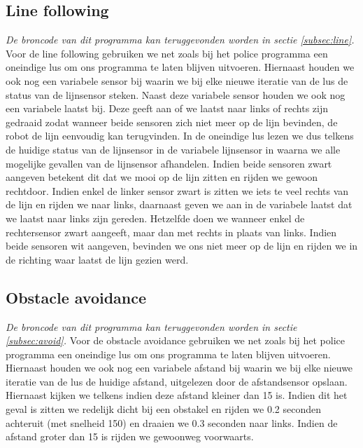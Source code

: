 \documentclass[12pt, titlepage]{article}
\begin{document}
\subsection{Line following}
\emph{De broncode van dit programma kan teruggevonden worden in sectie \ref{subsec:line}.}
\newline
\newline
Voor de line following gebruiken we net zoals bij het police programma een oneindige lus om ons programma te laten blijven uitvoeren. Hiernaast houden we ook nog een variabele sensor bij waarin we bij elke nieuwe iteratie van de lus de status van de lijnsensor steken. Naast deze variabele sensor houden we ook nog een variabele laatst bij. Deze geeft aan of we laatst naar links of rechts zijn gedraaid zodat wanneer beide sensoren zich niet meer op de lijn bevinden, de robot de lijn eenvoudig kan terugvinden. In de oneindige lus lezen we dus telkens de huidige status van de lijnsensor in de variabele lijnsensor in waarna we alle mogelijke gevallen van de lijnsensor afhandelen. Indien beide sensoren zwart aangeven betekent dit dat we mooi op de lijn zitten en rijden we gewoon rechtdoor. Indien enkel de linker sensor zwart is zitten we iets te veel rechts van de lijn en rijden we naar links, daarnaast geven we aan in de variabele laatst dat we laatst naar links zijn gereden. Hetzelfde doen we wanneer enkel de rechtersensor zwart aangeeft, maar dan met rechts in plaats van links. Indien beide sensoren wit aangeven, bevinden we ons niet meer op de lijn en rijden we in de richting waar laatst de lijn gezien werd.

\subsection{Obstacle avoidance}
\emph{De broncode van dit programma kan teruggevonden worden in sectie \ref{subsec:avoid}.}
\newline
\newline
Voor de obstacle avoidance gebruiken we net zoals bij het police programma een oneindige lus om ons programma te laten blijven uitvoeren. Hiernaast houden we ook nog een variabele afstand bij waarin we bij elke nieuwe iteratie van de lus de huidige afstand, uitgelezen door de afstandsensor opslaan. Hiernaast kijken we telkens indien deze afstand kleiner dan 15 is. Indien dit het geval is zitten we redelijk dicht bij een obstakel en rijden we 0.2 seconden achteruit (met snelheid 150) en draaien we 0.3 seconden naar links. Indien de afstand groter dan 15 is rijden we gewoonweg voorwaarts.
\end{document}
